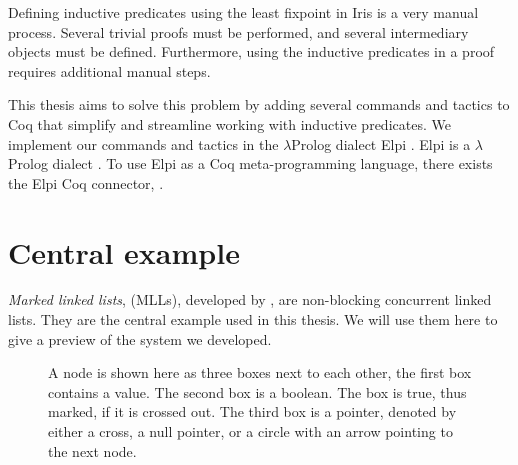 \documentclass[thesis.tex]{subfiles}
\begin{document}
Defining inductive predicates using the least fixpoint in Iris is a very manual process. Several trivial proofs must be performed, and several intermediary objects must be defined. Furthermore, using the inductive predicates in a proof requires additional manual steps.

This thesis aims to solve this problem by adding several commands and tactics to Coq that simplify and streamline working with inductive predicates. We implement our commands and tactics in the $\lambda$Prolog dialect Elpi \cite{dunchevELPIFastEmbeddable2015,guidiImplementingTypeTheory2019}. Elpi is a $\lambda$Prolog dialect \cite{millerHigherorderLogicProgramming1986,millerUniformProofsFoundation1991,belleanneePragmaticReconstructionLProlog1999,millerProgrammingHigherOrderLogic2012}. To use Elpi as a Coq meta-programming language, there exists the Elpi Coq connector, \ce \cite{tassiElpiExtensionLanguage2018}.

\section{Central example}
\emph{Marked linked lists}, (MLLs), developed by  \cite{harrisPragmaticImplementationNonblocking2001b}, are non-blocking concurrent linked lists. They are the central example used in this thesis. We will use them here to give a preview of the system we developed.
\begin{figure}[t]
  \centering
  \caption{A node is shown here as three boxes next to each other, the first box contains a value. The second box is a boolean. The box is true, thus marked, if it is crossed out. The third box is a pointer, denoted by either a cross, a null pointer, or a circle with an arrow pointing to the next node.}
  \label{fig:MLLdiag}
\end{figure}
\end{document}
